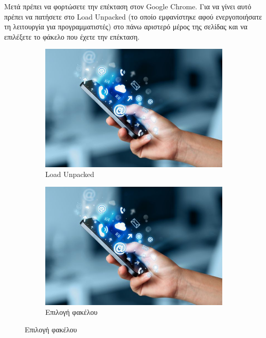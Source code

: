 \documentclass{article}
\begin{document}
Μετά πρέπει να φορτώσετε την επέκταση στον Google Chrome. Για να γίνει αυτό πρέπει να πατήσετε στο Load Unpacked (το οποίο εμφανίστηκε αφού ενεργοποιήσατε τη λειτουργία για προγραμματιστές) στο πάνω αριστερό μέρος της σελίδας και να επιλέξετε το φάκελο που έχετε την επέκταση.
\begin{figure}[H]
    \centering
    \begin{subfigure}{.45\textwidth}
        \includegraphics[width=\textwidth]{logo}
        \caption{Load Unpacked}
        \label{Fig:sub3}
    \end{subfigure}
    \hfill
    \begin{subfigure}{.45\textwidth}
        \includegraphics[width=\textwidth]{logo}
        \caption{Επιλογή φακέλου}
        \label{Fig:sub4}
    \end{subfigure}
\end{figure}
\end{document}
